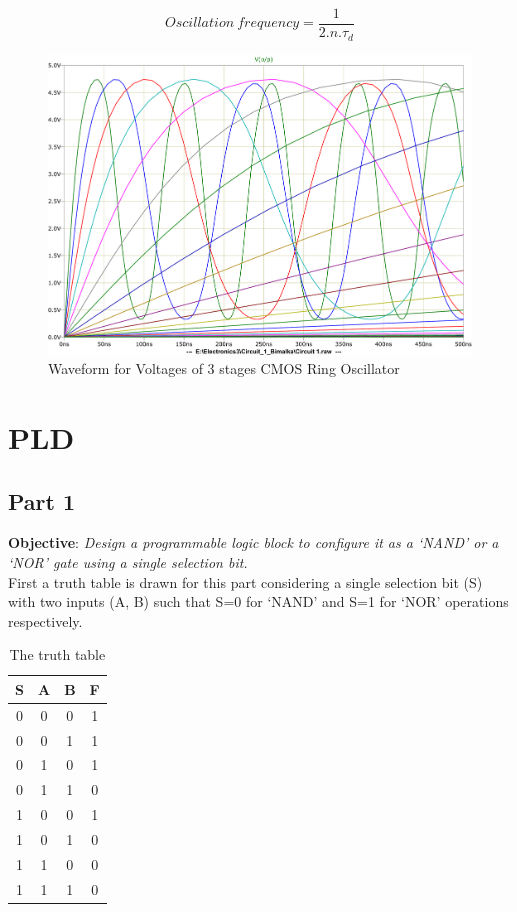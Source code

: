 \documentclass[a4paper,11pt]{article}%
\begin{document}
\[
Oscillation~frequency = \frac{1}{2.n.\tau_{d}}
\]

\begin{figure}[H]
	\centering
	\includegraphics[scale=0.5]{figures/cct1plot2}
	\caption{Waveform for Voltages of 3 stages CMOS Ring Oscillator}
\end{figure}


\pagebreak
\section{PLD}
\subsection{Part 1}
\textbf{Objective}: \textit{Design a programmable logic block to configure it as a `NAND' or a `NOR' gate using a single selection bit.}\\

First a truth table is drawn for this part considering a single selection bit (S) with two inputs (A, B) such that S=0 for ‘NAND’ and S=1 for ‘NOR’ operations respectively.
\begin{table}[H]
	\centering
	\begin{tabular}{|c |c| c| c|}
		\hline
		S & A & B & F \\\hline
		0 & 0 & 0 & 1 \\
		0 & 0 & 1 & 1 \\
		0 & 1 & 0 & 1 \\
		0 & 1 & 1 & 0 \\\hline
		1 & 0 & 0 & 1 \\
		1 & 0 & 1 & 0 \\
		1 & 1 & 0 & 0 \\
		1 & 1 & 1 & 0 \\\hline\hline
	\end{tabular}
\caption{The truth table}
\end{table}
\end{document}
